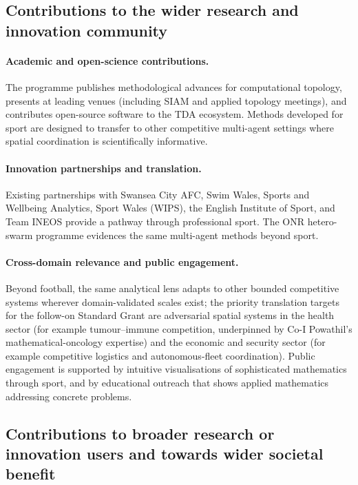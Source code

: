 \subsection{Contributions to the wider research and innovation community}

\paragraph{Academic and open-science contributions.}
The programme publishes methodological advances for computational topology, presents at leading venues (including SIAM and applied topology meetings), and contributes open-source software to the TDA ecosystem. Methods developed for sport are designed to transfer to other competitive multi-agent settings where spatial coordination is scientifically informative.

\paragraph{Innovation partnerships and translation.}
Existing partnerships with Swansea City AFC, Swim Wales, Sports and Wellbeing Analytics, Sport Wales (WIPS), the English Institute of Sport, and Team INEOS provide a pathway through professional sport. The ONR hetero-swarm programme evidences the same multi-agent methods beyond sport.

\paragraph{Cross-domain relevance and public engagement.}
Beyond football, the same analytical lens adapts to other bounded competitive systems wherever domain-validated scales exist; the priority translation targets for the follow-on Standard Grant are adversarial spatial systems in the health sector (for example tumour--immune competition, underpinned by Co-I Powathil's mathematical-oncology expertise) and the economic and security sector (for example competitive logistics and autonomous-fleet coordination). Public engagement is supported by intuitive visualisations of sophisticated mathematics through sport, and by educational outreach that shows applied mathematics addressing concrete problems.

\subsection{Contributions to broader research or innovation users and towards wider societal benefit}

